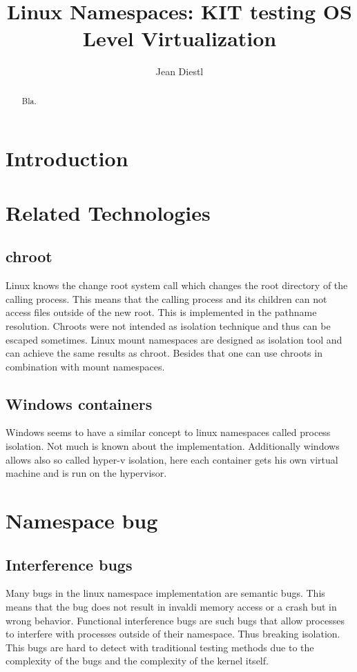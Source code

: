 \documentclass[10pt,twocolumn,a4paper]{article}
\author{Jean Diestl}
\begin{document}
\title{Linux Namespaces: KIT testing OS Level Virtualization}

\newcommand{\todo}[1]{{\texttt{[#1]}}}
\newcommand{\code}[1]{{\tt \small{#1}}}

\maketitle

\begin{abstract}
Bla.
\end{abstract}

\section{Introduction}\label{sec:introduction}
\section{Related Technologies}\label{sec:related}
\subsection{chroot}
Linux knows the change root system call which changes the root directory of the calling
process. This means that the calling process and its children can not access files outside of the
new root. This is implemented in the pathname resolution\cite{1}. Chroots were not intended as
isolation technique and thus can be escaped sometimes. Linux mount namespaces are
designed as isolation tool and can achieve the same results as chroot. Besides that one can use
chroots in combination with mount namespaces. %


\subsection{Windows containers}%
Windows seems to have a similar concept to linux namespaces called process isolation. Not much is known about the
implementation. Additionally windows allows also so called hyper-v isolation, here each container
gets his own virtual machine and is run on the hypervisor\cite{3}.

\section{Namespace bug}\label{sec:background}
\subsection{Interference bugs}
Many bugs in the linux namespace implementation are semantic bugs. This means that the 
bug does not result in invaldi memory access or a crash but in wrong behavior. Functional interference bugs are
such bugs that allow processes to interfere with processes outside  of their namespace. Thus
breaking isolation. This bugs are hard to detect with traditional testing methods due to the
complexity of the bugs and the complexity of the kernel itself.
\end{document}
